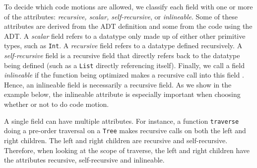 To decide which code motions are allowed, we classify each field with one or more of the attributes: \textit{recursive, scalar, self-recursive}, or \textit{inlineable}.
%
Some of these attributes are derived from the ADT definition and some from the code using the ADT.
%
A \emph{scalar} field refers to a datatype only made up of either other primitive types, such as \lstinline|Int|.
%
A \emph{recursive} field refers to a datatype defined recursively.
%
A \emph{self-recursive} field is a recursive field that directly refers back to the datatype being defined (such as a \lstinline|List| directly referencing itself).
Finally, we call a field \emph{inlineable} if the function being optimized makes a recursive call into this field .
Hence, an inlineable field is necessarily a recursive field.
As we show in the example below, the inlineable attribute is especially important when choosing whether or not to do code motion.

%
A single field can have multiple attributes.
For instance, a function \lstinline|traverse| doing a pre-order traversal on a \lstinline|Tree| makes recursive calls on both the
left and right children. The left and right children are recursive and self-recursive. Therefore, when looking at the scope of 
traverse, the left and right children have the attributes recursive, self-recursive and inlineable. 

